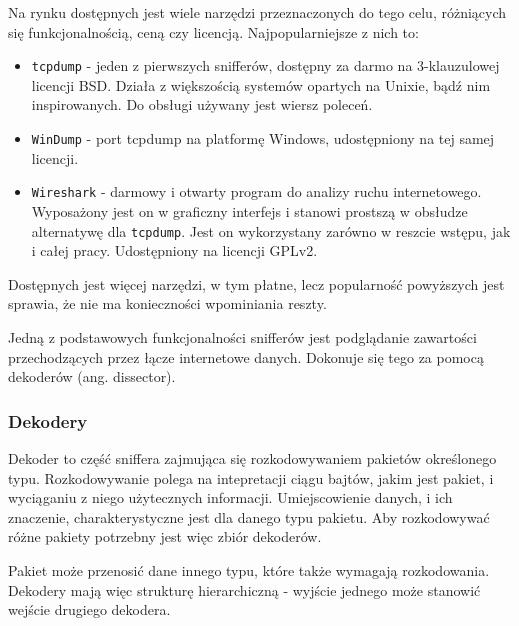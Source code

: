\documentclass[a4paper, 12pt, twoside, openright]{article}
\begin{document}
	Na rynku dostępnych jest wiele narzędzi przeznaczonych do tego celu, różniących się funkcjonalnością, ceną czy licencją.
	Najpopularniejsze z nich to:
	\begin{itemize}
		\item \texttt{tcpdump} - jeden z pierwszych snifferów, dostępny za darmo na 3-klauzulowej licencji BSD. Działa
			z większością systemów opartych na Unixie, bądź nim inspirowanych. Do obsługi używany jest wiersz poleceń.
		\item \texttt{WinDump} - port tcpdump na platformę Windows, udostępniony na tej samej licencji.
		\item \texttt{Wireshark} - darmowy i otwarty program do analizy ruchu internetowego. Wyposażony jest on w graficzny
			interfejs i stanowi prostszą w obsłudze alternatywę dla \texttt{tcpdump}. Jest on wykorzystany zarówno w reszcie
			wstępu, jak i całej pracy. Udostępniony na licencji GPLv2.
	\end{itemize}

	Dostępnych jest więcej narzędzi, w tym płatne, lecz popularność powyższych jest sprawia, że nie ma konieczności wpominiania
	reszty.

	Jedną z podstawowych funkcjonalności snifferów jest podglądanie zawartości przechodzących przez łącze internetowe danych.
	Dokonuje się tego za pomocą dekoderów (ang. dissector). 

	\newpage
	\subsubsection{Dekodery}
	\indent\par
	Dekoder to część sniffera zajmująca się rozkodowywaniem pakietów określonego typu. Rozkodowywanie polega na intepretacji
	ciągu bajtów, jakim jest pakiet, i wyciąganiu z niego użytecznych informacji. Umiejscowienie danych, i ich znaczenie,
	charakterystyczne jest dla danego typu pakietu. Aby rozkodowywać różne pakiety potrzebny jest więc zbiór dekoderów. 

	Pakiet może przenosić dane innego typu, które także wymagają rozkodowania. Dekodery mają więc strukturę hierarchiczną -
	wyjście jednego może stanowić wejście drugiego dekodera.
\end{document}
